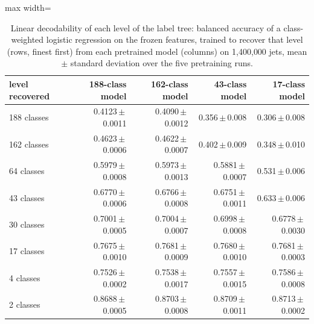 \begin{table}[t]
\centering
\small
\setlength{\tabcolsep}{4pt}
\caption{Linear decodability of each level of the label tree: balanced accuracy of a class-weighted logistic regression on the frozen features, trained to recover that level (rows, finest first) from each pretrained model (columns) on 1{,}400{,}000 jets, mean $\pm$ standard deviation over the five pretraining runs.}
\label{tab:recovery}
\begin{adjustbox}{max width=\linewidth}
\begin{tabular}{l rrrr}
\toprule
level recovered & 188-class model & 162-class model & 43-class model & 17-class model \\
\midrule
188 classes & 0.4123\,$\pm$\,0.0011 & 0.4090\,$\pm$\,0.0012 & 0.356\,$\pm$\,0.008 & 0.306\,$\pm$\,0.008 \\
162 classes & 0.4623\,$\pm$\,0.0006 & 0.4622\,$\pm$\,0.0007 & 0.402\,$\pm$\,0.009 & 0.348\,$\pm$\,0.010 \\
64 classes & 0.5979\,$\pm$\,0.0008 & 0.5973\,$\pm$\,0.0013 & 0.5881\,$\pm$\,0.0007 & 0.531\,$\pm$\,0.006 \\
43 classes & 0.6770\,$\pm$\,0.0006 & 0.6766\,$\pm$\,0.0008 & 0.6751\,$\pm$\,0.0011 & 0.633\,$\pm$\,0.006 \\
30 classes & 0.7001\,$\pm$\,0.0005 & 0.7004\,$\pm$\,0.0007 & 0.6998\,$\pm$\,0.0008 & 0.6778\,$\pm$\,0.0030 \\
17 classes & 0.7675\,$\pm$\,0.0010 & 0.7681\,$\pm$\,0.0009 & 0.7680\,$\pm$\,0.0010 & 0.7681\,$\pm$\,0.0003 \\
4 classes & 0.7526\,$\pm$\,0.0002 & 0.7538\,$\pm$\,0.0017 & 0.7557\,$\pm$\,0.0015 & 0.7586\,$\pm$\,0.0008 \\
2 classes & 0.8688\,$\pm$\,0.0005 & 0.8703\,$\pm$\,0.0008 & 0.8709\,$\pm$\,0.0011 & 0.8713\,$\pm$\,0.0002 \\
\bottomrule
\end{tabular}
\end{adjustbox}
\end{table}
